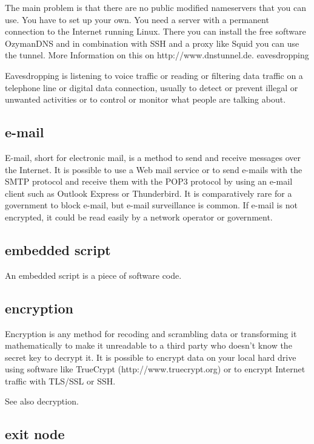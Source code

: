 The main problem is that there are no public modified nameservers that
you can use. You have to set up your own. You need a server with a
permanent connection to the Internet running Linux. There you can
install the free software OzymanDNS and in combination with SSH and a
proxy like Squid you can use the tunnel. More Information on this on
http://www.dnstunnel.de. eavesdropping

Eavesdropping is listening to voice traffic or reading or filtering data
traffic on a telephone line or digital data connection, usually to
detect or prevent illegal or unwanted activities or to control or
monitor what people are talking about.

\subsection{e-mail}

E-mail, short for electronic mail, is a method to send and receive
messages over the Internet. It is possible to use a Web mail service or
to send e-mails with the SMTP protocol and receive them with the POP3
protocol by using an e-mail client such as Outlook Express or
Thunderbird. It is comparatively rare for a government to block e-mail,
but e-mail surveillance is common. If e-mail is not encrypted, it could
be read easily by a network operator or government.

\subsection{embedded script}

An embedded script is a piece of software code.

\subsection{encryption}

Encryption is any method for recoding and scrambling data or
transforming it mathematically to make it unreadable to a third party
who doesn't know the secret key to decrypt it. It is possible to encrypt
data on your local hard drive using software like TrueCrypt
(http://www.truecrypt.org) or to encrypt Internet traffic with TLS/SSL
or SSH.

See also decryption.

\subsection{exit node}

